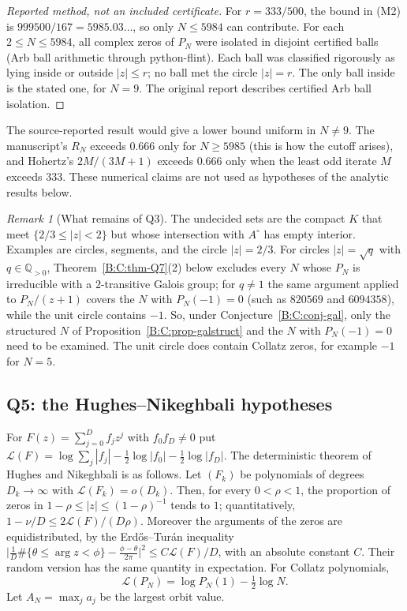 \documentclass[11pt,a4paper]{article}
\theoremstyle{definition}
\theoremstyle{remark}
\newtheorem{remark}[theorem]{Remark}
\numberwithin{equation}{section}
\begin{document}
\begin{proof}[Reported method, not an included certificate]
For $r=333/500$, the bound in (M2) is $999500/167=5985.03\ldots$, so only
$N\le5984$ can contribute.  For each $2\le N\le5984$, all complex zeros of $P_N$
were isolated in disjoint certified balls (Arb ball arithmetic \cite{R038}
through python-flint).  Each ball was classified rigorously as lying inside or
outside $|z|\le r$; no ball met the circle $|z|=r$.  The only ball inside is the
stated one, for $N=9$. The original report describes certified Arb ball isolation.
\end{proof}

The source-reported result would give a lower bound uniform in $N\ne9$.  The
manuscript's $R_N$ exceeds $0.666$ only for $N\ge5985$ (this is how the cutoff
arises), and Hohertz's $2M/(3M+1)$ exceeds $0.666$ only when the least odd
iterate $M$ exceeds $333$.  These numerical claims are not used as hypotheses of the analytic results below.

\begin{remark}[What remains of Q3]\label{B:C:rem-Q3}
The undecided sets are the compact $K$ that meet $\{2/3\le|z|<2\}$ but whose
intersection with $A^\circ$ has empty interior.  Examples are circles, segments,
and the circle $|z|=2/3$.  For circles $|z|=\sqrt q$ with $q\in\mathbb Q_{>0}$,
Theorem~\ref{B:C:thm-Q7}(2) below excludes every $N$ whose $P_N$ is irreducible
with a $2$-transitive Galois group; for $q\ne1$ the same argument applied to
$P_N/(z+1)$ covers the $N$ with $P_N(-1)=0$ (such as $820569$ and $6094358$), while the
unit circle contains $-1$.  So, under Conjecture~\ref{B:C:conj-gal}, only
the structured $N$ of Proposition~\ref{B:C:prop-galstruct} and the $N$ with
$P_N(-1)=0$ need to be examined.
The unit circle does contain Collatz zeros, for example $-1$ for $N=5$.
\end{remark}

\subsection{Q5: the Hughes--Nikeghbali hypotheses}\label{B:C:ssec-Q5}

For $F(z)=\sum_{j=0}^Df_jz^j$ with $f_0f_D\ne0$ put
$\mathcal L(F)=\log\sum_j|f_j|-\tfrac12\log|f_0|-\tfrac12\log|f_D|$.  The
deterministic theorem of Hughes and Nikeghbali \cite[Thm.~1 and Thm.~3]{R026} is
as follows.  Let $(F_k)$ be polynomials of degrees $D_k\to\infty$ with
$\mathcal L(F_k)=o(D_k)$.  Then, for every $0<\rho<1$, the proportion of zeros in
$1-\rho\le|z|\le(1-\rho)^{-1}$ tends to $1$; quantitatively, $1-\nu/D\le
2\mathcal L(F)/(D\rho)$.  Moreover the arguments of the zeros are
equidistributed, by the Erd\H{o}s--Tur\'an inequality \cite{R027}
$\bigl|\tfrac1D\#\{\theta\le\arg z<\phi\}-\tfrac{\phi-\theta}{2\pi}\bigr|^2\le
C\mathcal L(F)/D$, with an absolute constant $C$.  Their random version
\cite[Thm.~5]{R026} has the same quantity in expectation.  For Collatz
polynomials,
\[
\mathcal L(P_N)=\log P_N(1)-\tfrac12\log N .
\]
Let $A_N=\max_ja_j$ be the largest orbit value.
\end{document}
